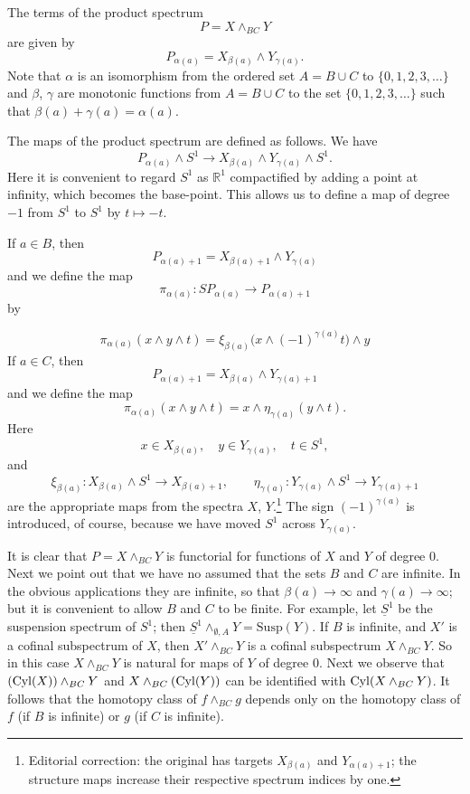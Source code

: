 \documentclass[../main]{subfiles}
\begin{document}
The terms of the product spectrum
\[
    P = X \wedge_{BC} Y
\]
are given by
\[
    P_{\alpha(a)} = X_{\beta(a)} \wedge Y_{\gamma(a)}.
\]
Note that $\alpha$ is an isomorphism from the ordered set $A = B \cup C$ to $\{0, 1, 2, 3, \ldots\}$ and $\beta$, $\gamma$ are monotonic functions from $A = B \cup C$ to the set $\{0, 1, 2, 3, \ldots\}$ such that $\beta(a) + \gamma(a) = \alpha(a)$.

The maps of the product spectrum are defined as follows.
We have
\[
    P_{\alpha(a)} \wedge S^{1} \longrightarrow X_{\beta(a)} \wedge Y_{\gamma(a)} \wedge S^{1}.
\]
Here it is convenient to regard $S^{1}$ as $\mathbb{R}^{1}$ compactified by adding a point at infinity, which becomes the base-point.
This allows us to define a map of degree $-1$ from $S^{1}$ to $S^{1}$ by $t \mapsto -t$.

If $a \in B$, then
\[
    P_{\alpha(a) + 1} = X_{\beta(a) + 1} \wedge Y_{\gamma(a)}
\]
and we define the map
\[
    \pi_{\alpha(a)} \colon SP_{\alpha(a)} \longrightarrow P_{\alpha(a) + 1}
\]
by 

\[
    \pi_{\alpha(a)}(x \wedge y \wedge t) = \xi_{\beta(a)} \big(x \wedge (-1)^{\gamma(a)}t\big) \wedge y
\]
If $a\in C$, then
\[
    P_{\alpha(a)+1}=X_{\beta(a)}\wedge Y_{\gamma(a)+1}
\]
and we define the map
\[
    \pi_{\alpha(a)}(x \wedge y \wedge t) = x \wedge \eta_{\gamma(a)} (y \wedge t).
\]
Here
\[
    x \in X_{\beta(a)}, \quad y \in Y_{\gamma(a)}, \quad t \in S^{1},
\]
and
\[
    \xi_{\beta(a)} \colon X_{\beta(a)} \wedge S^{1} \longrightarrow X_{\beta(a)+1}, \qquad \eta_{\gamma(a)} \colon Y_{\gamma(a)} \wedge S^{1} \longrightarrow Y_{\gamma(a)+1}
\]
are the appropriate maps from the spectra $X$, $Y$.\footnote{Editorial correction: the original has targets $X_{\beta(a)}$ and $Y_{\alpha(a)+1}$; the structure maps increase their respective spectrum indices by one.}
The sign $(-1)^{\gamma(a)}$ is introduced, of course, because we have moved $S^{1}$ across $Y_{\gamma(a)}$.

It is clear that $P = X \wedge_{BC} Y$ is functorial for functions of $X$ and $Y$ of degree 0.
Next we point out that we have no assumed that the sets $B$ and $C$ are infinite.
In the obvious applications they are infinite, so that $\beta(a) \longrightarrow \infty$ and $\gamma(a) \longrightarrow \infty$;
but it is convenient to allow $B$ and $C$ to be finite.
For example, let $\underline{S}^{1}$ be the suspension spectrum of $S^{1}$;
then $\underline{S}^{1} \wedge_{\emptyset, A} Y = \mathrm{Susp}(Y)$.
If $B$ is infinite, and $X'$ is a cofinal subspectrum of $X$, then $X' \wedge_{BC} Y$ is a cofinal subspectrum $X \wedge_{BC} Y$.
So in this case $X \wedge_{BC} Y$ is natural for maps of $Y$ of degree 0.
Next we observe that $(\mathrm{Cyl}(X)) \wedge_{BC} Y$ and $X \wedge_{BC} (\mathrm{Cyl}(Y))$ can be identified with $\mathrm{Cyl}(X \wedge_{BC} Y)$.
It follows that the homotopy class of $f \wedge_{BC} g$ depends only on the homotopy class of $f$ (if $B$ is infinite) or $g$ (if $C$ is infinite).
\end{document}
